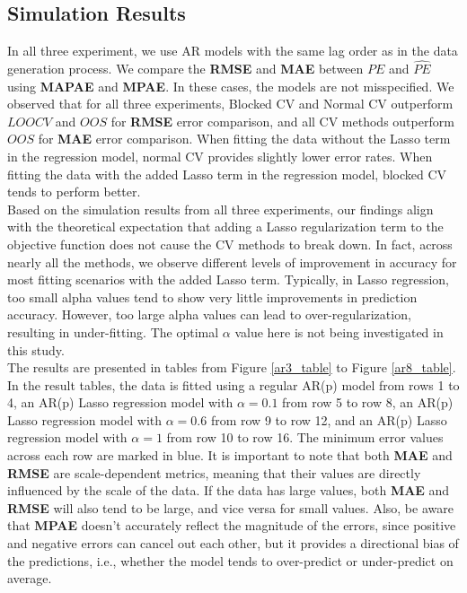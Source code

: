 \documentclass[12pt, oneside]{amsart}
\theoremstyle{definition}
\theoremstyle{remark}
\numberwithin{equation}{section}
\begin{document}
\subsection{Simulation Results}
In all three experiment, we use AR models with the same lag order as in the data generation process. We compare the \textbf{RMSE} and \textbf{MAE} between $PE$ and $\hat{PE}$ using \textbf{MAPAE} and \textbf{MPAE}. In these cases, the models are not misspecified. We observed that for all three experiments, Blocked CV and Normal CV outperform $LOOCV$ and $OOS$ for \textbf{RMSE} error comparison, and all CV methods outperform $OOS$ for \textbf{MAE} error comparison. When fitting the data without the Lasso term in the regression model, normal CV provides slightly lower error rates. When fitting the data with the added Lasso term in the regression model, blocked CV tends to perform better. \\

Based on the simulation results from all three experiments, our findings align with the theoretical expectation that adding a Lasso regularization term to the objective function does not cause the CV methods to break down. In fact, across nearly all the methods, we observe different levels of improvement in accuracy for most fitting scenarios with the added Lasso term. Typically, in Lasso regression, too small alpha values tend to show very little improvements in prediction accuracy. However, too large alpha values can lead to over-regularization, resulting in under-fitting. The optimal $\alpha$ value here is not being investigated in this study.\\

The results are presented in tables from Figure \ref{ar3_table} to Figure \ref{ar8_table}. In the result tables, the data is fitted using a regular AR(p) model from rows 1 to 4, an AR(p) Lasso regression model with $\alpha = 0.1$ from row 5 to row 8, an AR(p) Lasso regression model with $\alpha = 0.6$ from row 9 to row 12, and an AR(p) Lasso regression model with $\alpha = 1$ from row 10 to row 16. The minimum error values across  each row are marked in blue. It is important to note that both \textbf{MAE} and \textbf{RMSE} are scale-dependent metrics, meaning that their values are directly influenced by the scale of the data. If the data has large values, both \textbf{MAE} and \textbf{RMSE} will also tend to be large, and vice versa for small values. Also, be aware that \textbf{MPAE} doesn't accurately reflect the magnitude of the errors, since positive and negative errors can cancel out each other, but it provides a directional bias of the predictions, i.e., whether the model tends to over-predict or under-predict on average. 
\end{document}

